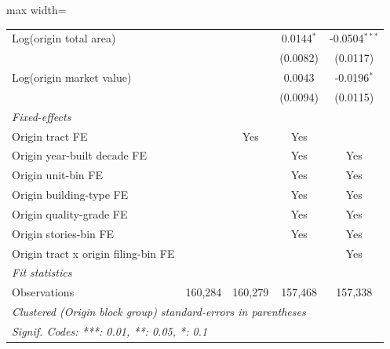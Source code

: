 \documentclass[
  11pt,
]{article}
\begin{document}
\begin{adjustbox}{max width=\textwidth}
\begin{tabular}{lcccc}
   Log(origin total area)                         &                       &               & 0.0144$^{*}$    & -0.0504$^{***}$\\   
                                                  &                       &               & (0.0082)        & (0.0117)\\   
   Log(origin market value)                       &                       &               & 0.0043          & -0.0196$^{*}$\\   
                                                  &                       &               & (0.0094)        & (0.0115)\\   
   \midrule
   \emph{Fixed-effects}\\
   Origin tract FE                                &                       & Yes           & Yes             & \\  
   Origin year-built decade FE                    &                       &               & Yes             & Yes\\  
   Origin unit-bin FE                             &                       &               & Yes             & Yes\\  
   Origin building-type FE                        &                       &               & Yes             & Yes\\  
   Origin quality-grade FE                        &                       &               & Yes             & Yes\\  
   Origin stories-bin FE                          &                       &               & Yes             & Yes\\  
   Origin tract x origin filing-bin FE            &                       &               &                 & Yes\\  
   \midrule
   \emph{Fit statistics}\\
   Observations                                   & 160,284               & 160,279       & 157,468         & 157,338\\  
   \midrule \midrule
   \multicolumn{5}{l}{\emph{Clustered (Origin block group) standard-errors in parentheses}}\\
   \multicolumn{5}{l}{\emph{Signif. Codes: ***: 0.01, **: 0.05, *: 0.1}}\\
\end{tabular}
\par\endgroup

\end{adjustbox}
\end{document}
